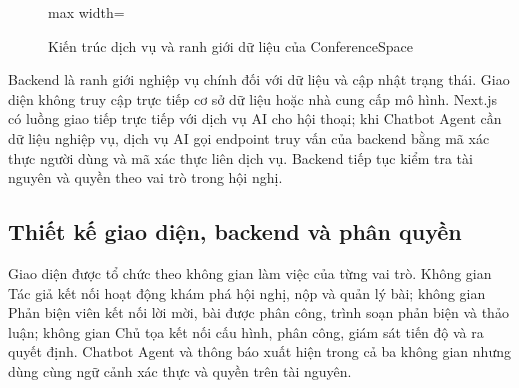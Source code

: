 \begin{figure}[H]
\centering
\begin{adjustbox}{max width=\textwidth}
\end{adjustbox}
\caption{Kiến trúc dịch vụ và ranh giới dữ liệu của ConferenceSpace}
\label{fig:ch3-demo-architecture}
\end{figure}

Backend là ranh giới nghiệp vụ chính đối với dữ liệu và cập nhật trạng thái. Giao diện không truy cập trực tiếp cơ sở dữ liệu hoặc nhà cung cấp mô hình. Next.js có luồng giao tiếp trực tiếp với dịch vụ AI cho hội thoại; khi Chatbot Agent cần dữ liệu nghiệp vụ, dịch vụ AI gọi endpoint truy vấn của backend bằng mã xác thực người dùng và mã xác thực liên dịch vụ. Backend tiếp tục kiểm tra tài nguyên và quyền theo vai trò trong hội nghị.

\subsection{Thiết kế giao diện, backend và phân quyền}

Giao diện được tổ chức theo không gian làm việc của từng vai trò. Không gian Tác giả kết nối hoạt động khám phá hội nghị, nộp và quản lý bài; không gian Phản biện viên kết nối lời mời, bài được phân công, trình soạn phản biện và thảo luận; không gian Chủ tọa kết nối cấu hình, phân công, giám sát tiến độ và ra quyết định. Chatbot Agent và thông báo xuất hiện trong cả ba không gian nhưng dùng cùng ngữ cảnh xác thực và quyền trên tài nguyên.

